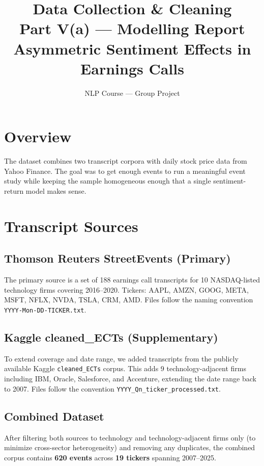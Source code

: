 \documentclass[12pt,a4paper]{article}
\title{\textbf{Data Collection \& Cleaning}\\[0.3em]
\large Part V(a) --- Modelling Report\\
Asymmetric Sentiment Effects in Earnings Calls}
\author{NLP Course --- Group Project}
\date{}
\begin{document}
\maketitle

\section{Overview}

The dataset combines two transcript corpora with daily stock price data from Yahoo Finance.
The goal was to get enough events to run a meaningful event study while keeping
the sample homogeneous enough that a single sentiment-return model makes sense.

\section{Transcript Sources}

\subsection{Thomson Reuters StreetEvents (Primary)}

The primary source is a set of 188 earnings call transcripts for 10 NASDAQ-listed
technology firms covering 2016--2020.
Tickers: AAPL, AMZN, GOOG, META, MSFT, NFLX, NVDA, TSLA, CRM, AMD.
Files follow the naming convention \texttt{YYYY-Mon-DD-TICKER.txt}.

\subsection{Kaggle cleaned\_ECTs (Supplementary)}

To extend coverage and date range, we added transcripts from the publicly available
Kaggle \texttt{cleaned\_ECTs} corpus.
This adds 9 technology-adjacent firms including IBM, Oracle, Salesforce, and Accenture,
extending the date range back to 2007.
Files follow the convention \texttt{YYYY\_Qn\_ticker\_processed.txt}.

\subsection{Combined Dataset}

After filtering both sources to technology and technology-adjacent firms only
(to minimize cross-sector heterogeneity) and removing any duplicates,
the combined corpus contains \textbf{620 events} across \textbf{19 tickers}
spanning 2007--2025.
\end{document}
